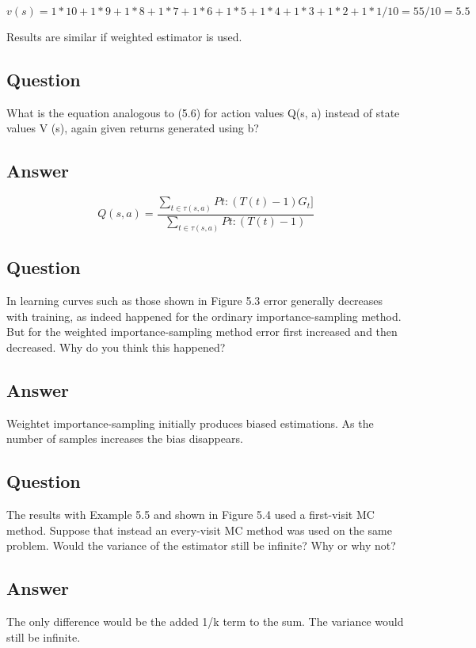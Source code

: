 \documentclass[11pt]{article}
\begin{document}
    $ v(s) = 1 * 10 + 1 * 9 + 1 * 8 + 1 * 7 + 1 * 6 + 1 * 5 + 1* 4 + 1 * 3 + 1 * 2 + 1 * 1 / 10 =  55 / 10 = 5.5 $

    Results are similar if weighted estimator is used.

    \subsection{Question}

    What is the equation analogous to (5.6) for action values Q(s, a) instead of state values V (s), again given returns generated using b?


    \subsection*{Answer}

    \begin{equation}
        Q(s,a) = \frac{\sum_{t \in \tau (s,a) } Pt:(T(t)-1) G_{t}] }{ \sum_{t \in \tau (s,a) } Pt:(T(t)-1) }
    \end{equation}

    \subsection{Question}

    In learning curves such as those shown in Figure 5.3 error generally decreases with training, as indeed happened for the ordinary importance-sampling method.
    But for the weighted importance-sampling method error first increased and then decreased.
    Why do you think this happened?

    \subsection*{Answer}

    Weightet importance-sampling initially produces biased estimations.
    As the number of samples increases the bias disappears.

    \subsection{Question}

    The results with Example 5.5 and shown in Figure 5.4 used a first-visit MC method.
    Suppose that instead an every-visit MC method was used on the same problem.
    Would the variance of the estimator still be infinite? Why or why not?

    \subsection*{Answer}

    The only difference would be the added 1/k term to the sum.
    The variance would still be infinite.
\end{document}
